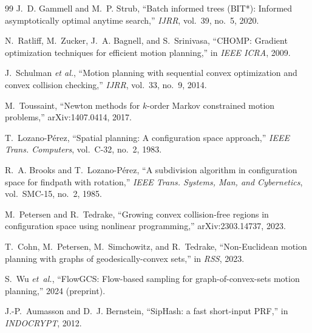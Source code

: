 \documentclass[journal]{IEEEtran}
\begin{document}
\begin{thebibliography}{99}
J.~D. Gammell and M.~P. Strub, ``Batch informed trees (BIT*): Informed asymptotically optimal anytime search,'' \emph{IJRR}, vol.~39, no.~5, 2020.

N.~Ratliff, M.~Zucker, J.~A. Bagnell, and S.~Srinivasa, ``CHOMP: Gradient optimization techniques for efficient motion planning,'' in \emph{IEEE ICRA}, 2009.

J.~Schulman \textit{et al.}, ``Motion planning with sequential convex optimization and convex collision checking,'' \emph{IJRR}, vol.~33, no.~9, 2014.

M.~Toussaint, ``Newton methods for $k$-order Markov constrained motion problems,'' arXiv:1407.0414, 2017.

T.~Lozano-P\'erez, ``Spatial planning: A configuration space approach,''
\emph{IEEE Trans. Computers}, vol.~C-32, no.~2, 1983.

R.~A. Brooks and T.~Lozano-P\'erez, ``A subdivision algorithm in
configuration space for findpath with rotation,'' \emph{IEEE Trans.
Systems, Man, and Cybernetics}, vol.~SMC-15, no.~2, 1985.

M.~Petersen and R.~Tedrake, ``Growing convex collision-free regions in
configuration space using nonlinear programming,'' arXiv:2303.14737, 2023.

T.~Cohn, M.~Petersen, M.~Simchowitz, and R.~Tedrake, ``Non-Euclidean motion
planning with graphs of geodesically-convex sets,'' in \emph{RSS}, 2023.

S.~Wu \emph{et~al.}, ``FlowGCS: Flow-based sampling for graph-of-convex-sets motion
planning,'' 2024 (preprint).

J.-P.~Aumasson and D.~J. Bernstein, ``SipHash: a fast short-input PRF,'' in
\emph{INDOCRYPT}, 2012.

\end{thebibliography}
\end{document}
